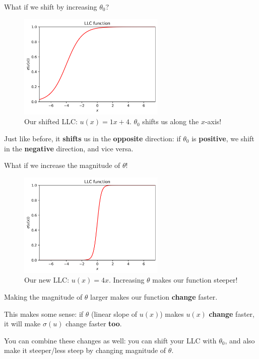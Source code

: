         What if we shift by increasing $\theta_0$?
        
        \begin{figure}[H]
            \centering
            \includegraphics[width=70mm,scale=0.5]{images/classification_images/theta_0_+2.png}
            \caption*{Our shifted LLC: $u(x)=1x+4 $. $\theta_0$ shifts us along the $x$-axis!}
        \end{figure}
        
         Just like before, it \textbf{shifts} us in the \textbf{opposite} direction: if $\theta_0$ is \textbf{positive}, we shift in the \textbf{negative} direction, and vice versa.
         
         What if we increase the magnitude of $\theta$!
         
         \begin{figure}[H]
            \centering
            \includegraphics[width=70mm,scale=0.5]{images/classification_images/theta_x4.png}
            \caption*{Our new LLC: $u(x)=4x$. Increasing $\theta$ makes our function steeper!}
        \end{figure}
        
        Making the magnitude of $\theta$ larger makes our function \textbf{change} faster. 
        
        This makes some sense: if $\theta$ (linear slope of $u(x)$) makes $u(x)$ \textbf{change} faster, it will make $\sigma(u)$ change faster \textbf{too}.
        
        You can combine these changes as well: you can shift your LLC with $\theta_0$, and also make it steeper/less steep by changing magnitude of $\theta$.\\
        
